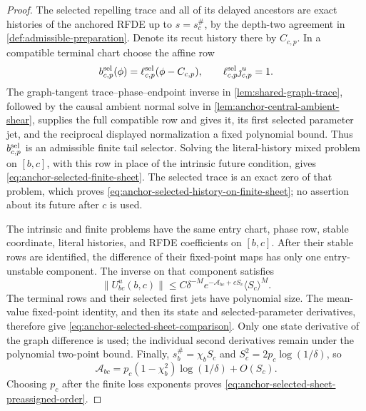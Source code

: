 \begin{proof}
The selected repelling trace and all of its delayed ancestors are exact
histories of the anchored RFDE up to \(s=s_c^\#\), by the depth-two
agreement in \cref{def:admissible-preparation}.  Denote its recut history
there by \(C_{c,p}\).  In a compatible terminal chart choose the affine row
\begin{equation}
 b_{c,p}^{\rm sel}(\phi)
 =\ell_{c,p}^{\rm sel}(\phi-C_{c,p}),
 \qquad
 \ell_{c,p}^{\rm sel}\jmath_{c,p}^{u}=1.           \label{eq:anchor-selected-terminal-row}
\end{equation}
The graph-tangent trace--phase--endpoint inverse in
\cref{lem:shared-graph-trace}, followed by the causal ambient normal solve
in \cref{lem:anchor-central-ambient-shear}, supplies the full compatible
row and gives it, its first selected parameter jet, and the reciprocal
displayed normalization a fixed polynomial bound.  Thus
\(b_{c,p}^{\rm sel}\) is an admissible finite tail selector.  Solving the
literal-history mixed problem on \([b,c]\), with this row in place of the
intrinsic future condition, gives \cref{eq:anchor-selected-finite-sheet}.
The selected trace is an exact zero of that problem, which proves
\cref{eq:anchor-selected-history-on-finite-sheet}; no assertion about its
future after \(c\) is used.

The intrinsic and finite problems have the same entry chart, phase row,
stable coordinate, literal histories, and RFDE coefficients on \([b,c]\).
After their stable rows are identified, the difference of their fixed-point
maps has only one entry-unstable component.  The inverse on that component
satisfies
\begin{equation}
 \|U^u_{bc}(b,c)\|
 \le C\delta^{-M}e^{-\mathscr A_{bc}+cS_c}
       \langle S_c\rangle^M.                       \label{eq:anchor-selected-backward-action}
\end{equation}
The terminal rows and their selected first jets have polynomial size.  The
mean-value fixed-point identity, and then its state and selected-parameter
derivatives, therefore give \cref{eq:anchor-selected-sheet-comparison}.
Only one state derivative of the graph difference is used; the individual
second derivatives remain under the polynomial two-point bound.  Finally,
\(s_b^\#=\chi_bS_c\) and
\(S_c^2=2p_c\log(1/\delta)\), so
\[
 \mathscr A_{bc}
 =p_c(1-\chi_b^2)\log(1/\delta)+O(S_c).
\]
Choosing \(p_c\) after the finite loss exponents proves
\cref{eq:anchor-selected-sheet-preassigned-order}.
\end{proof}

